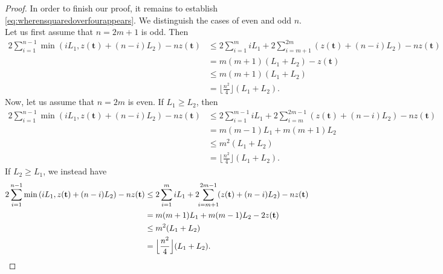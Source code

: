 \documentclass[11pt,reqno]{amsart}
\theoremstyle{definition}
\theoremstyle{remark}
\numberwithin{equation}{section}
\numberwithin{thm}{section}
\numberwithin{table}{section}
\begin{document}
\begin{proof}
In  order to finish our proof, it  remains to establish \eqref{eq:wherensquaredoverfourappears}. We distinguish the cases of even and odd $n$.
Let us first assume that $n=2m+1$ is odd. Then 
\begin{align*}
    2 \sum_{i=1}^{n-1} \min \left( 
   i L_1, z(\mathbf{t}) + (n-i) L_2
   \right) -n z(\mathbf{t}) &\le 2  \sum_{i=1}^m i L_1 + 2\!\!\sum_{i=m+1}^{2m} \!(z(\mathbf{t}) + (n-i) L_2)  -n z(\mathbf{t}) \\
   &= m(m+1)(L_1 + L_2) - z(\mathbf{t})
   \\
   &\le m(m+1)(L_1 + L_2) 
   \\
   & = \Big\lfloor \frac{n^2}{4} \Big\rfloor (L_1 + L_2).
\end{align*}
Now, let us assume that $n = 2m$ is even. If $L_1 \ge L_2$, then 
\begin{align*}
      2 \sum_{i=1}^{n-1} \min \left( 
   i L_1, z(\mathbf{t}) + (n-i) L_2
   \right) -n z(\mathbf{t}) &\le 2 \sum_{i=1}^{m-1} i L_1 + 2\!\sum_{i=m}^{2m-1} (z(\mathbf{t}) + (n-i) L_2)  -n z(\mathbf{t}) \\
   &= m(m-1) L_1 + m(m+1)L_2 \\
   &\le m^2 (L_1 + L_2)\\
   &= \Big\lfloor \frac{n^2}{4} \Big\rfloor (L_1 + L_2).
\end{align*}
If $L_2 \ge L_1$, we instead have 
\begin{align*}
      2 \sum_{i=1}^{n-1} \min \left( 
   i L_1, z(\mathbf{t}) + (n-i) L_2
   \right) -n z(\mathbf{t}) &\le 2 \sum_{i=1}^{m} i L_1 + 2\!\!\sum_{i=m+1}^{2m-1} \!(z(\mathbf{t}) + (n-i) L_2)  -n z(\mathbf{t}) \\
   &= m(m+1) L_1 + m(m-1)L_2 -2z(\mathbf{t}) \\
   &\le m^2 (L_1 + L_2)\\
   &= \Big\lfloor \frac{n^2}{4} \Big\rfloor (L_1 + L_2). \qedhere
\end{align*}
\end{proof}
\end{document}
